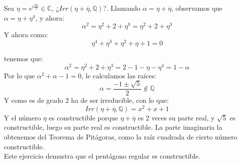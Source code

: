 \begin{ejercicio}
    Sea $\eta = e^{i\frac{2\pi}{5}}\in \mathbb{C}$, ¿$Irr(\eta+\overline{\eta},\mathbb{Q})$?. Llamando $\alpha = \eta+\overline{\eta}$, observamos que $\alpha = \eta + \eta^4$, y ahora:
    \begin{equation*}
        \alpha^2 = \eta^2 + 2+\eta^8 = \eta^2 + 2 + \eta^3
    \end{equation*}
    Y ahora como:
    \begin{equation*}
        \eta^4 + \eta^3 + \eta^2 + \eta + 1 = 0
    \end{equation*}

    tenemos que:
    \begin{equation*}
        \alpha^2 = \eta^2 + 2 + \eta^3 = 2 - 1 -\eta-\eta^4 = 1-\alpha
    \end{equation*}
    Por lo que $\alpha^2 + \alpha - 1 = 0$, le calculamos las raíces:
    \begin{equation*}
        \alpha = \dfrac{-1\pm \sqrt{5}}{2}\notin \mathbb{Q}
    \end{equation*}
    Y como es de grado 2 ha de ser irreducible, con lo que:
    \begin{equation*}
        Irr(\eta+\overline{\eta},\mathbb{Q}) = x^2+x+1
    \end{equation*}
    Y el número $\eta$ es constructible porque $\eta+\overline{\eta}$ es 2 veces su parte real, y $\sqrt{5}$ es constructible, luego su parte real es constructible. La parte imaginaria la obtenemos del Teorema de Pitágoras, como la raíz cuadrada de cierto número constructible.\\

    \noindent
    Este ejercicio demustra que el pentágono regular es constructible.
\end{ejercicio}

